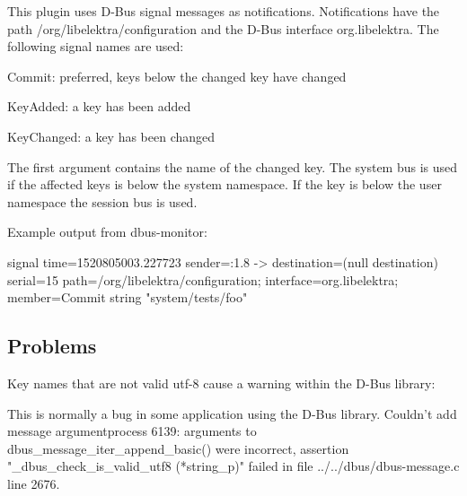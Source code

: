 This plugin uses D-\/\+Bus signal messages as notifications. Notifications have the path {\ttfamily /org/libelektra/configuration} and the D-\/\+Bus interface {\ttfamily org.\+libelektra}. The following signal names are used\+:


\begin{DoxyItemize}
\item Commit\+: preferred, keys below the changed key have changed
\item Key\+Added\+: a key has been added
\item Key\+Changed\+: a key has been changed
\end{DoxyItemize}

The first argument contains the name of the changed key. The system bus is used if the affected keys is below the {\ttfamily system} namespace. If the key is below the {\ttfamily user} namespace the session bus is used.

Example output from {\ttfamily dbus-\/monitor}\+:


\begin{DoxyCode}
signal time=1520805003.227723 sender=:1.8 -> destination=(null destination) serial=15
       path=/org/libelektra/configuration; interface=org.libelektra; member=Commit
   string "system/tests/foo"
\end{DoxyCode}


\subsection*{Problems}

Key names that are not valid utf-\/8 cause a warning within the D-\/\+Bus library\+:


\begin{DoxyCode}
This is normally a bug in some application using the D-Bus library.
Couldn't add message argumentprocess 6139: arguments to dbus\_message\_iter\_append\_basic() were incorrect,
       assertion "\_dbus\_check\_is\_valid\_utf8 (*string\_p)" failed in file ../../dbus/dbus-message.c line 2676.
\end{DoxyCode}
 